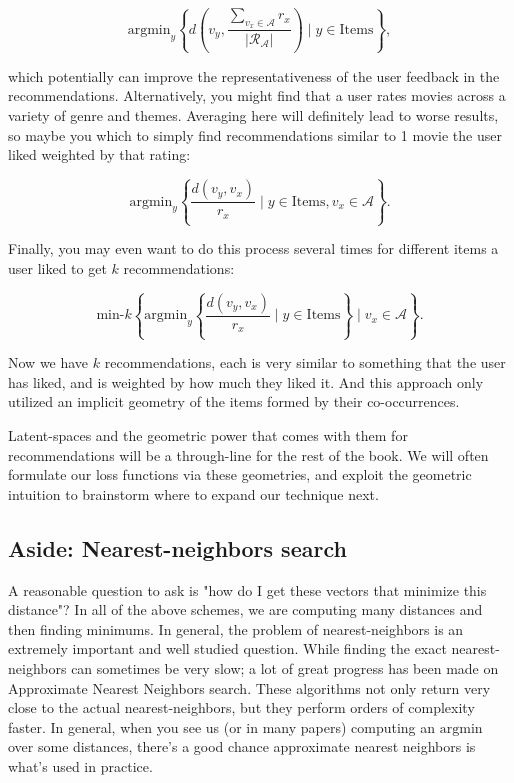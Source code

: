 \begin{equation}
	\textrm{argmin}_y\left\lbrace d(v_y,\frac{\sum_{v_x\in\mathcal{A}}r_x}{|\mathcal{R_A}|})\mid y\in \textrm{Items}\right\rbrace,
\end{equation}

which potentially can improve the representativeness of the user feedback in the recommendations. Alternatively, you might find that a user rates movies across a variety of genre and themes. Averaging here will definitely lead to worse results, so maybe you which to simply find recommendations similar to 1 movie the user liked weighted by that rating:

\begin{equation}
	\textrm{argmin}_y\left\lbrace \frac{d(v_y,v_x)}{r_x}\mid y\in \textrm{Items}, v_x\in\mathcal{A}\right\rbrace.
\end{equation}

Finally, you may even want to do this process several times for different items a user liked to get $k$ recommendations:

\begin{equation}
	\textrm{min-}k \left\lbrace \textrm{argmin}_y\left\lbrace \frac{d(v_y,v_x)}{r_x}\mid y\in \textrm{Items}\right\rbrace\mid v_x\in\mathcal{A}\right\rbrace.
\end{equation}

Now we have $k$ recommendations, each is very similar to something that the user has liked, and is weighted by how much they liked it. And this approach only utilized an implicit geometry of the items formed by their co-occurrences. 

Latent-spaces and the geometric power that comes with them for recommendations will be a through-line for the rest of the book. We will often formulate our loss functions via these geometries, and exploit the geometric intuition to brainstorm where to expand our technique next. 

\subsection{Aside: Nearest-neighbors search}

A reasonable question to ask is "how do I get these vectors that minimize this distance"? In all of the above schemes, we are computing many distances and then finding minimums. In general, the problem of nearest-neighbors is an extremely important and well studied question. While finding the exact nearest-neighbors can sometimes be very slow; a lot of great progress has been made on Approximate Nearest Neighbors search. These algorithms not only return very close to the actual nearest-neighbors, but they perform orders of complexity faster. In general, when you see us (or in many papers) computing an $\textrm{argmin}$ over some distances, there's a good chance approximate nearest neighbors is what's used in practice.